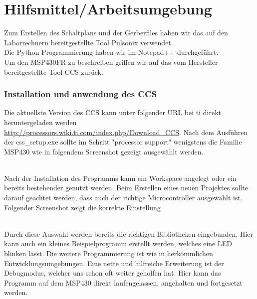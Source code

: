 %
\chapter{Hilfsmittel/Arbeitsumgebung}
\label{chap:arbeit}

Zum Erstellen des Schaltplans und der Gerberfiles haben wir das auf den Laborrechnern bereitgestellte Tool Pulsonix verwendet.\\
Die Python Programmierung haben wir im Notepad++ durchgeführt.\\
Um den MSP430FR zu beschreiben griffen wir auf das vom Hersteller bereitgestellte Tool CCS zurück.

\subsection{Installation und anwendung des CCS}
\raggedright
Die aktuellste Version des CCS kann unter folgender URL bei ti direkt heruntergeladen werden \url{http://processors.wiki.ti.com/index.php/Download_CCS}.
Nach dem Ausführen der css\_setup.exe sollte im Schritt "processor support" wenigstens die Familie MSP430 wie in folgendem Screenshot gezeigt ausgewählt werden.\\
	\centering
	\\
\raggedright	
Nach der Installation des Programms kann ein Workspace angelegt oder ein bereits bestehender genutzt werden.
Beim Erstellen eines neuen Projektes sollte darauf geachtet werden, dass auch der richtige Microcontroller ausgewählt ist. Folgender Screenshot zeigt die korrekte Einstellung\\
	\centering
	\\
\raggedright	
Durch diese Auswahl werden bereits die richtigen Bibliotheken eingebunden.
Hier kann auch ein kleines Beispielprogramm erstellt werden, welches eine LED blinken lässt.
Die weitere Programmierung ist wie in herkömmlichen Entwicklungsumgebungen.
Eine nette und hilfreiche Erweiterung ist der Debugmodus, welcher uns schon oft weiter geholfen hat. Hier kann das Programm auf dem MSP430 direkt laufengelassen, angehalten und fortgesetzt werden.



